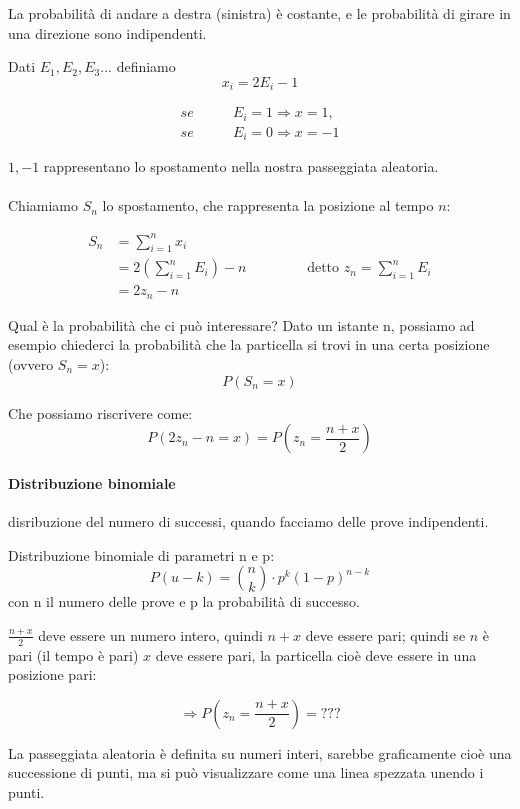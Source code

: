 \documentclass[a4paper,12pt]{book}
\newcommand\ddfrac[2]{\frac{\displaystyle #1}{\displaystyle #2}}
\begin{document}
La probabilità di andare a destra (sinistra) è costante, e le probabilità di girare in una direzione sono indipendenti. 

Dati $ E_1, E_2, E_3... $ definiamo
$$x_i = 2E_i - 1$$

\begin{align*}
	se \qquad & E_i = 1 \Rightarrow x=1, \\
	se \qquad & E_i = 0 \Rightarrow x=-1
\end{align*}

$ 1, -1 $ rappresentano lo spostamento nella nostra passeggiata aleatoria. 
\\
\\
Chiamiamo $ S_n $ lo spostamento, che rappresenta la posizione al tempo $ n $:
\begin{center}
\begin{align*}
	S_n & = \sum_{i=1}^{n} x_i \\
	& = 2(\sum_{i=1}^{n}E_i)-n \qquad \qquad \text{ detto } z_n = \sum_{i=1}^{n} E_i \\
	& = 2z_n - n
\end{align*}
\end{center}

Qual è la probabilità che ci può interessare? Dato un istante n, possiamo ad esempio chiederci la probabilità che la particella si trovi in una certa posizione (ovvero $ S_n = x $):
$$ P(S_n = x) $$

Che possiamo riscrivere come:
$$ P(2z_n - n = x) = P(z_n = \frac{n+x}{2})$$


\begin{tcolorbox}
	\paragraph{Distribuzione binomiale} disribuzione del numero di successi, quando facciamo delle prove indipendenti. 
	
	Distribuzione binomiale di parametri n e p:
	$$P(u - k) = \binom{n}{k} \cdot p^k(1-p)^{n-k}$$
	con n il numero delle prove e p la probabilità di successo. 
\end{tcolorbox}


$\ddfrac{n+x}{2}$ deve essere un numero intero, quindi $ n+x $ deve essere pari; quindi se $ n $ è pari (il tempo è pari) $ x $ deve essere pari, la particella cioè deve essere in una posizione pari:

$$\Rightarrow P(z_n = \frac{n+x}{2}) = ???$$

La passeggiata aleatoria è definita su numeri interi, sarebbe graficamente cioè una successione di punti, ma si può visualizzare come una linea spezzata unendo i punti. 
\end{document}
